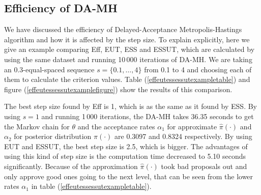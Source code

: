 \subsection{Efficiency of DA-MH}

We have discussed the efficiency of Delayed-Acceptance Metropolis-Hastings algorithm and how it is affected by the step size. To explain explicitly, here we give an example comparing Eff, EUT, ESS and ESSUT, which are calculated by using the same dataset and running 10\,000 iterations of DA-MH. We are taking an 0.3-equal-spaced sequence $s=\{0.1,\dots,4\}$ from 0.1 to 4 and choosing each of them to calculate the criterion values. Table (\ref{effeutessessutexampletable}) and figure (\ref{effeutessessutexamplefigure}) show the results of this comparison. 

The best step size found by Eff is 1, which is as the same as it found by ESS. By using $s=1$ and running 1\,000 iterations, the DA-MH takes 36.35 seconds to get the Markov chain for $\theta$ and the acceptance rates $\alpha_1$ for approximate $\hat{\pi}(\cdot)$ and $\alpha_2$ for posterior distribution $\pi(\cdot)$ are 0.3097 and 0.8324 respectively. By using EUT and ESSUT, the best step size is 2.5, which is bigger. The advantages of using this kind of step size is the computation time decreased to 5.10 seconds significantly. Because of the approximation $\hat{\pi}(\cdot)$ took bad proposals out and only approve good ones going to the next level, that can be seen from the lower rates $\alpha_1$ in table (\ref{effeutessessutexampletable}). 



